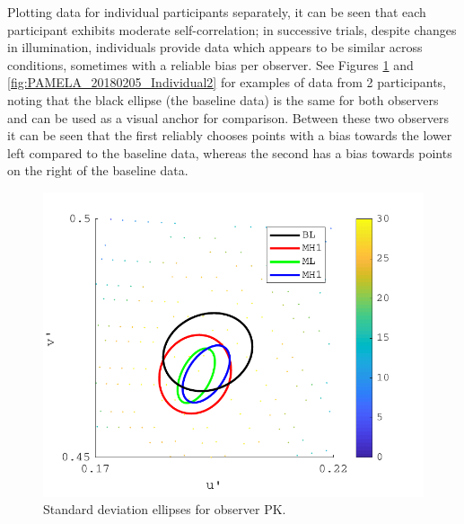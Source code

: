 Plotting data for individual participants separately, it can be seen that each participant exhibits moderate self-correlation; in successive trials, despite changes in illumination, individuals provide data which appears to be similar across conditions, sometimes with a reliable bias per observer. See Figures \ref{fig:PAMELA_20180205_Individual} and \ref{fig:PAMELA_20180205_Individual2} for examples of data from 2 participants, noting that the black ellipse (the baseline data) is the same for both observers and can be used as a visual anchor for comparison. Between these two observers it can be seen that the first reliably chooses points with a bias towards the lower left compared to the baseline data, whereas the second has a bias towards points on the right of the baseline data. 

\begin{figure}[hbtp]
\includegraphics[max width=\textwidth]{figs/tablet/PAMELA_20180205_Individual.pdf} 
\caption{Standard deviation ellipses for observer PK.}
\label{fig:PAMELA_20180205_Individual}
\end{figure}

